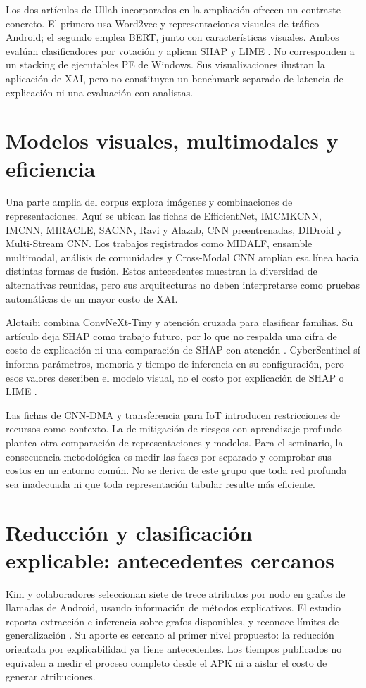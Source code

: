 Los dos artículos de Ullah incorporados en la ampliación ofrecen un contraste concreto. El primero usa Word2vec y representaciones visuales de tráfico Android; el segundo emplea BERT, junto con características visuales. Ambos evalúan clasificadores por votación y aplican SHAP y LIME \parencite{Ullah2022Word2vec,Ullah2022BERT}. No corresponden a un stacking de ejecutables PE de Windows. Sus visualizaciones ilustran la aplicación de XAI, pero no constituyen un benchmark separado de latencia de explicación ni una evaluación con analistas.

\section{Modelos visuales, multimodales y eficiencia}
Una parte amplia del corpus explora imágenes y combinaciones de representaciones. Aquí se ubican las fichas de EfficientNet, IMCMKCNN, IMCNN, MIRACLE, SACNN, Ravi y Alazab, CNN preentrenadas, DIDroid y Multi-Stream CNN. Los trabajos registrados como MIDALF, ensamble multimodal, análisis de comunidades y Cross-Modal CNN amplían esa línea hacia distintas formas de fusión. Estos antecedentes muestran la diversidad de alternativas reunidas, pero sus arquitecturas no deben interpretarse como pruebas automáticas de un mayor costo de XAI.

Alotaibi combina ConvNeXt-Tiny y atención cruzada para clasificar familias. Su artículo deja SHAP como trabajo futuro, por lo que no respalda una cifra de costo de explicación ni una comparación de SHAP con atención \parencite{Alotaibi2025Multimodal}. CyberSentinel sí informa parámetros, memoria y tiempo de inferencia en su configuración, pero esos valores describen el modelo visual, no el costo por explicación de SHAP o LIME \parencite{Basak2024CyberSentinel}.

Las fichas de CNN-DMA y transferencia para IoT introducen restricciones de recursos como contexto. La de mitigación de riesgos con aprendizaje profundo plantea otra comparación de representaciones y modelos. Para el seminario, la consecuencia metodológica es medir las fases por separado y comprobar sus costos en un entorno común. No se deriva de este grupo que toda red profunda sea inadecuada ni que toda representación tabular resulte más eficiente.

\section{Reducción y clasificación explicable: antecedentes cercanos}
Kim y colaboradores seleccionan siete de trece atributos por nodo en grafos de llamadas de Android, usando información de métodos explicativos. El estudio reporta extracción e inferencia sobre grafos disponibles, y reconoce límites de generalización \parencite{Kim2026FCG}. Su aporte es cercano al primer nivel propuesto: la reducción orientada por explicabilidad ya tiene antecedentes. Los tiempos publicados no equivalen a medir el proceso completo desde el APK ni a aislar el costo de generar atribuciones.

